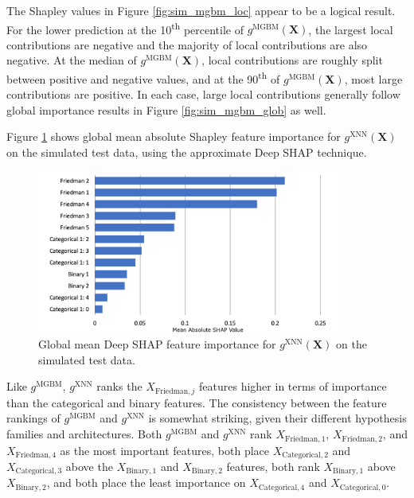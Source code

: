 \documentclass[information,article,submit,moreauthors,pdftex]{definitions/mdpi}
\begin{document}
\noindent The Shapley values in Figure \ref{fig:sim_mgbm_loc} appear to be a logical result. For the lower prediction at the 10\textsuperscript{th} percentile of $g^\text{MGBM}(\mathbf{X})$, the largest local contributions are negative and the majority of local contributions are also negative. At the median of $g^\text{MGBM}(\mathbf{X})$, local contributions are roughly split between positive and negative values, and at the 90\textsuperscript{th} of $g^\text{MGBM}(\mathbf{X})$, most large contributions are positive. In each case, large local contributions generally follow global importance results in Figure \ref{fig:sim_mgbm_glob} as well.

Figure \ref{fig:sim_xnn_glob} shows global mean absolute Shapley feature importance for $g^\text{XNN}(\mathbf{X})$ on the simulated test data, using the approximate Deep SHAP technique.  

\begin{figure}[htb]
	\centering
	\includegraphics[width=10cm]{img/sim_xnn_glob.png}
	\caption{Global mean Deep SHAP feature importance for $g^\text{XNN}(\mathbf{X})$ on the simulated test data.}
	\label{fig:sim_xnn_glob}
\end{figure} 

\noindent Like $g^\text{MGBM}$, $g^\text{XNN}$ ranks the $X_{\text{Friedman},j}$ features higher in terms of importance than the categorical and binary features. The consistency between the feature rankings of $g^\text{MGBM}$ and $g^\text{XNN}$ is somewhat striking, given their different hypothesis families and architectures. Both $g^\text{MGBM}$ and $g^\text{XNN}$ rank $X_{\text{Friedman},1}$, $X_{\text{Friedman},2}$, and $X_{\text{Friedman},4}$ as the most important features, both place $X_{\text{Categorical},2}$ and $X_{\text{Categorical},3}$ above the $X_{\text{Binary},1}$ and $X_{\text{Binary},2}$ features, both rank $X_{\text{Binary},1}$ above $X_{\text{Binary},2}$, and both place the least importance on $X_{\text{Categorical},4}$ and $X_{\text{Categorical},0}$. 
\end{document}
